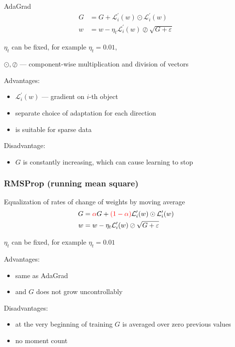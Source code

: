 \documentclass[fullscreen=true, bookmarks=true, hyperref={pdfencoding=unicode}]{beamer}
\begin{document}
\begin{frame}{AdaGrad}
  \pause
   \begin{align*}
      G &= G + \mathcal{L}_i^\prime(w) \odot \mathcal{L}_i^\prime(w) \\
      w &= w - {\eta_t} {\mathcal{L}_i^\prime(w)}\oslash{\sqrt{G + \varepsilon}}
   \end{align*}

   $\eta_t$ can be fixed, for example $\eta_t = 0.01$,

   $\odot, \oslash$ — component-wise multiplication and division of vectors

  \pause
   Advantages:
   \begin{itemize}
     \item $\mathcal{L}_i^\prime(w)$ — gradient on $i$-th object
     \item separate choice of adaptation for each direction
     \item is suitable for sparse data
   \end{itemize}

  \pause
  Disadvantage:
  \begin{itemize}
    \item $G$ is constantly increasing, which can cause learning to stop
  \end{itemize}


\end{frame}


\begin{frame}
  \frametitle{RMSProp (running mean square)}

  \pause
   Equalization of rates of change of weights by moving average
   \begin{align*}
      G &= {\color{red}\alpha} G + {\color{red}(1 - \alpha)}\mathcal{L}_i^\prime(w) \odot \mathcal{L}_i^\prime (w) \\
      w &= w - {\eta_t} {\mathcal{L}_i^\prime(w)}\oslash{\sqrt{G + \varepsilon}}
   \end{align*}

   $\eta_t$ can be fixed, for example $\eta_t = 0.01$

  \pause
   Advantages:
   \begin{itemize}
     \item same as AdaGrad
     \item and $G$ does not grow uncontrollably
   \end{itemize}

  \pause
  Disadvantages:
  \begin{itemize}
    \item at the very beginning of training $G$ is averaged over zero previous values
    \item no moment count
  \end{itemize}


\end{frame}
\end{document}
